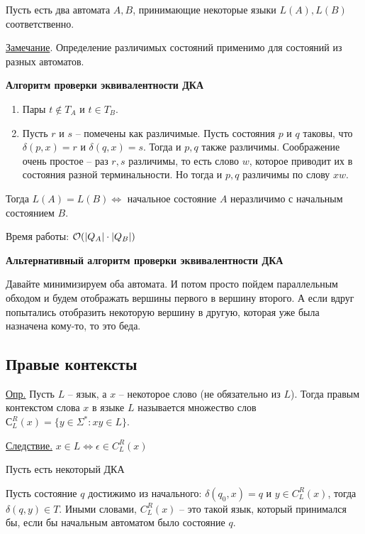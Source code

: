 Пусть есть два автомата $ A, B $, принимающие некоторые языки $ L(A), L(B) $ соответственно. 

\underline{Замечание}. Определение различимых состояний применимо для состояний из разных автоматов.

\textbf{Алгоритм проверки эквивалентности ДКА}

\begin{enumerate}
	\item Пары $ t \notin T_A $ и $ t \in T_B $. 
	
	\item Пусть $ r $ и $ s $ -- помечены как различимые. Пусть состояния $ p $ и $ q $ таковы, что $ \delta(p, x) = r $ и $ \delta(q, x) = s $. Тогда и $ p, q $ также различимы. Соображение очень простое -- раз $ r,s $ различимы, то есть слово $ w $, которое приводит их в состояния разной терминальности. Но тогда и $ p, q $ различимы по слову $ xw $.

\end{enumerate}

Тогда $ L(A) = L(B) \Leftrightarrow $ начальное состояние $ A $ неразличимо с начальным состоянием $ B $.

Время работы: $ \mathcal{O}(|Q_A| \cdot |Q_B|) $

\bigskip

\textbf{Альтернативный алгоритм проверки эквивалентности ДКА}

Давайте минимизируем оба автомата. И потом просто пойдем параллельным обходом и будем отображать вершины первого в вершину второго. А если вдруг попытались отобразить некоторую вершину в другую, которая уже была назначена кому-то, то это беда.


\bigskip


\subsection{Правые контексты}

\underline{Опр.} Пусть $ L $ -- язык, а $ x $ -- некоторое слово (не обязательно из $ L $). Тогда правым контекстом слова $ x $ в языке $ L $ называется множество слов $ С^R_L(x) = \{ y \in \Sigma^* \colon xy \in L\} $.

\underline{Следствие.} $ x \in L \Leftrightarrow \epsilon \in C_L^R(x) $

Пусть есть некоторый ДКА


Пусть состояние $ q $ достижимо из начального: $ \delta (q_0, x) = q $ и $ y \in C_L^R(x) $, тогда $ \delta(q, y) \in T $. Иными словами, $ C_L^R(x) $ -- это такой язык, который принимался бы, если бы начальным автоматом было состояние $ q $. 

